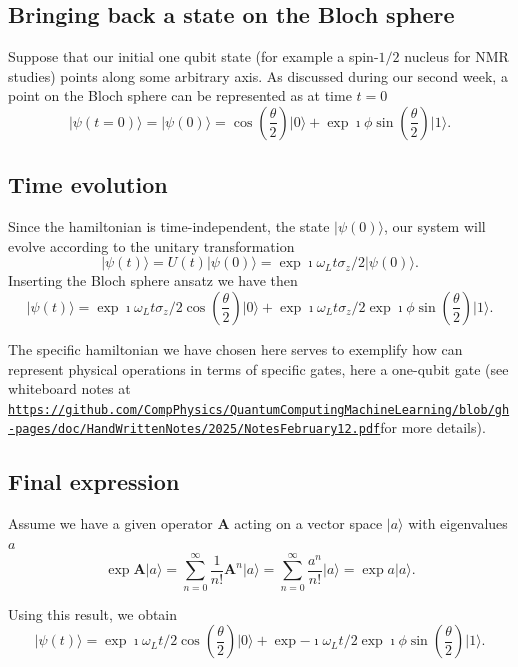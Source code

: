 \documentclass[%
oneside,                 %
final,                   %
10pt]{article}
\begin{document}
\subsection{Bringing back a state on the Bloch sphere}

Suppose that our initial one qubit state (for example a spin-$1/2$
nucleus for NMR studies) points along some arbitrary axis. As
discussed during our second week, a point on the Bloch sphere can be
represented as at time $t=0$
\[
\vert \psi(t=0) \rangle = \vert \psi(0) \rangle=\cos{(\frac{\theta}{2})}\vert 0\rangle +\exp{\imath\phi}\sin{(\frac{\theta}{2})}\vert 1\rangle.
\]

\subsection{Time evolution}

Since the hamiltonian is time-independent, the state $\vert \psi(0)
\rangle$, our system will evolve according to the unitary transformation 
\[
\vert \psi(t) \rangle = U(t)\vert \psi(0) \rangle=\exp{\imath\omega_L t\sigma_z/2}\vert \psi(0) \rangle.
\]
Inserting the Bloch sphere ansatz we have then
\[
\vert \psi(t) \rangle=\exp{\imath\omega_L t\sigma_z/2}\cos{(\frac{\theta}{2})}\vert 0\rangle +\exp{\imath\omega_L t\sigma_z/2}\exp{\imath\phi}\sin{(\frac{\theta}{2})}\vert 1\rangle.
\]

The specific hamiltonian we have chosen here serves to exemplify how can represent physical operations in terms of specific gates, here a one-qubit gate (see whiteboard notes at \href{{https://github.com/CompPhysics/QuantumComputingMachineLearning/blob/gh-pages/doc/HandWrittenNotes/2025/NotesFebruary12.pdf}}{\nolinkurl{https://github.com/CompPhysics/QuantumComputingMachineLearning/blob/gh-pages/doc/HandWrittenNotes/2025/NotesFebruary12.pdf}}for more details).

\subsection{Final expression}
Assume we have a given operator $\bm{A}$ acting on a  vector space $\vert a\rangle$ with eigenvalues $a$ 
\[
\exp{\bm{A}}\vert a\rangle=\sum_{n=0}^{\infty} \frac{1}{n!}\bm{A}^n\vert a\rangle=\sum_{n=0}^{\infty} \frac{a^n}{n!}\vert a\rangle=\exp{a}\vert a\rangle.
\]

Using this result, we obtain
\[
\vert \psi(t) \rangle=\exp{\imath\omega_L t/2}\cos{(\frac{\theta}{2})}\vert 0\rangle +\exp{-\imath\omega_L t/2}\exp{\imath\phi}\sin{(\frac{\theta}{2})}\vert 1\rangle.
\]
\end{document}
